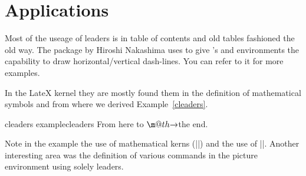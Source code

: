 \section{Applications}

Most of the useage of leaders is in table of contents and old tables fashioned the old way. The package  by Hiroshi Nakashima uses  to give \latex’s  and  environments the capability to draw horizontal/vertical dash-lines. You can refer to it for more examples.

In the LateX kernel they are mostly found them in the definition of mathematical symbols and from where we derived Example~\ref{cleaders}.

\begin{texexample}{cleaders example}{cleaders}
 \makeatletter
 \def\rightarrowfill{$\m@th\smash-\mkern-7mu%
  \cleaders\hbox{$\mkern-2mu\smash-\mkern-2mu$}\hfill
  \mkern-7mu\mathord\rightarrow$}
 \makeatother
From here to \rightarrowfill the end.
\end{texexample}

Note in the example the use of mathematical kerns (|\mkern|) and the use of 
|\smash|. Another interesting area was the definition of various commands in the
picture environment using solely leaders.


















